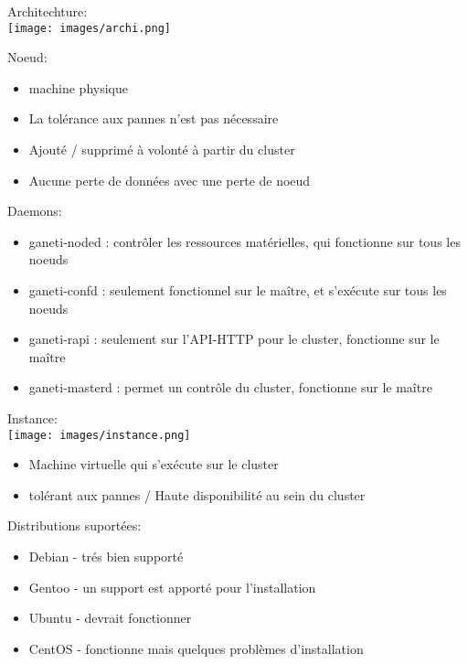 \documentclass{beamer}
\begin{document}
\begin{frame}
Architechture:\\
\texttt{[image: images/archi.png]}
\end{frame}

\begin{frame}
Noeud:\\
\begin{itemize}
\item machine physique
\item La tolérance aux pannes n'est pas nécessaire
\item Ajouté / supprimé à volonté à partir du cluster
\item Aucune perte de données avec une perte de noeud
\end{itemize}
\end{frame}

\begin{frame}
Daemons:\\
\begin{itemize}
\item ganeti-noded : contrôler les ressources matérielles, qui fonctionne sur tous les noeuds
\item ganeti-confd : seulement fonctionnel sur le maître, et s'exécute sur tous les noeuds
\item ganeti-rapi : seulement sur l'API-HTTP  pour le cluster, fonctionne sur le maître
\item ganeti-masterd :  permet un contrôle du cluster, fonctionne sur le maître
\end{itemize}
\end{frame}

\begin{frame}
Instance:\\
\texttt{[image: images/instance.png]}
\begin{itemize}
\item Machine virtuelle qui s'exécute sur le cluster
\item tolérant aux pannes / Haute disponibilité au sein du cluster
\end{itemize}
\end{frame}

\begin{frame}
Distributions suportées:\\
\begin{itemize}
\item Debian - trés bien supporté
\item Gentoo - un support est apporté pour l'installation
\item Ubuntu - devrait fonctionner
\item CentOS - fonctionne mais quelques problèmes d'installation
\end{itemize}
\end{frame}
\end{document}
